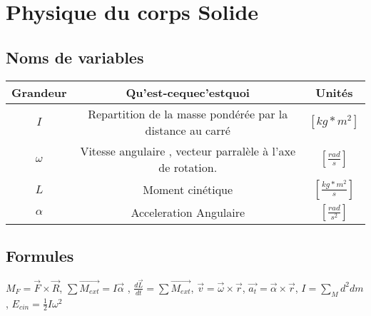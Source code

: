 \documentclass[10pt,a4paper]{article}
\begin{document}
\section{Physique du corps Solide}

\subsection{Noms de variables}

\begin{tabular}{|c|c|c|}
\hline 
Grandeur & Qu'est-cequec'estquoi & Unités \\ 
\hline 
$I$ & Repartition de la masse pondérée par la distance au carré & $[kg*m^2]$ \\ 
\hline
$\omega$ & Vitesse angulaire , vecteur parralèle à l'axe de rotation. & $[\frac{rad}{s}]$ \\ 
\hline
$L$ & Moment cinétique & $[\frac{kg*m^2}{s}]$ \\
\hline
$\alpha$ & Acceleration Angulaire & $[\frac{rad}{s^2}]$ \\
\hline
\end{tabular}

\subsection{Formules}
$M_F = \vec F \times \vec R$,
$\sum \vec{M_{ext}} = I\vec{\alpha}$ ,
$\frac{d\vec{L}}{dt} = \sum \vec{M_{ext}}$,
$\vec{v} = \vec{\omega} \times \vec{r}$,
$\vec{a_t} = \vec{\alpha} \times \vec{r}$,
$I = \sum \limits_M d^2 dm$,
$E_{cin} = \frac{1}{2}I\omega^2$
\end{document}
